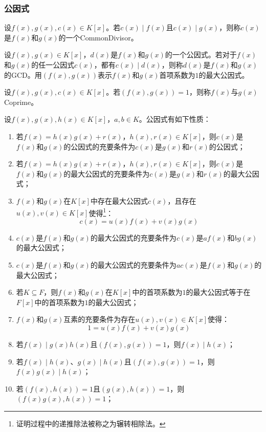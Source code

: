 \subsubsection{公因式}
\begin{definition}
	设$f(x),g(x),c(x)\in K[x]$。若$c(x)\mid f(x)$且$c(x)\mid g(x)$，则称$c(x)$是$f(x)$和$g(x)$的一个\gls{CommonDivisor}。
\end{definition}
\begin{definition}
	设$f(x),g(x)\in K[x]$，$d(x)$是$f(x)$和$g(x)$的一个公因式。若对于$f(x)$和$g(x)$的任一公因式$c(x)$，都有$c(x)\mid d(x)$，则称$d(x)$是$f(x)$和$g(x)$的\gls{GCD}。用$(f(x),g(x))$表示$f(x)$和$g(x)$首项系数为$1$的最大公因式。
\end{definition}
\begin{definition}
	设$f(x),g(x),c(x)\in K[x]$。若$(f(x),g(x))=1$，则称$f(x)$与$g(x)$\gls{Coprime}。
\end{definition}
\begin{property}\label{prop:CommonDivision}
	设$f(x),g(x),h(x)\in K[x]$，$a,b\in K$。公因式有如下性质：
	\begin{enumerate}
		\item 若$f(x)=h(x)g(x)+r(x)$，$h(x),r(x)\in K[x]$，则$c(x)$是$f(x)$和$g(x)$的公因式的充要条件为$c(x)$是$g(x)$和$r(x)$的公因式；
		\item 若$f(x)=h(x)g(x)+r(x)$，$h(x),r(x)\in K[x]$，则$c(x)$是$f(x)$和$g(x)$的最大公因式的充要条件为$c(x)$是$g(x)$和$r(x)$的最大公因式；
		\item $f(x)$和$g(x)$在$K[x]$中存在最大公因式$c(x)$，且存在$u(x),v(x)\in K[x]$使得\footnote{证明过程中的递推除法被称之为辗转相除法。}：
		\begin{equation*}
			c(x)=u(x)f(x)+v(x)g(x)
		\end{equation*}
		\item $c(x)$是$f(x)$和$g(x)$的最大公因式的充要条件为$c(x)$是$af(x)$和$bg(x)$的最大公因式；
		\item $c(x)$是$f(x)$和$g(x)$的最大公因式的充要条件为$ac(x)$是$f(x)$和$g(x)$的最大公因式；
		\item 若$K\subseteq F$，则$f(x)$和$g(x)$在$K[x]$中的首项系数为$1$的最大公因式等于在$F[x]$中的首项系数为$1$的最大公因式；
		\item $f(x)$和$g(x)$互素的充要条件为存在$u(x),v(x)\in K[x]$使得：
		\begin{equation*}
			1=u(x)f(x)+v(x)g(x)
		\end{equation*}
		\item 若$f(x)\mid g(x)h(x)$且$(f(x),g(x))=1$，则$f(x)\mid h(x)$；
		\item 若$f(x)\mid h(x)$、$g(x)\mid h(x)$且$(f(x),g(x))=1$，则$f(x)g(x)\mid h(x)$；
		\item 若$(f(x),h(x))=1$且$(g(x),h(x))=1$，则$(f(x)g(x),h(x))=1$；
	\end{enumerate}
\end{property}
